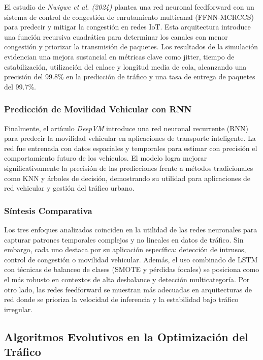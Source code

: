 \documentclass{svproc} %
\begin{document}
 El estudio de \textit{Nwigwe et al. (2024)} plantea una red neuronal feedforward con un sistema de control de congestión de enrutamiento multicanal (FFNN-MCRCCS) para predecir y mitigar la congestión en redes IoT. Esta arquitectura introduce una función recursiva cuadrática para determinar los canales con menor congestión y priorizar la transmisión de paquetes. Los resultados de la simulación evidencian una mejora sustancial en métricas clave como jitter, tiempo de estabilización, utilización del enlace y longitud media de cola, alcanzando una precisión del 99.8\% en la predicción de tráfico y una tasa de entrega de paquetes del 99.7\%.
 
\subsubsection{Predicción de Movilidad Vehicular con RNN}
 
 Finalmente, el artículo \textit{DeepVM} introduce una red neuronal recurrente (RNN) para predecir la movilidad vehicular en aplicaciones de transporte inteligente. La red fue entrenada con datos espaciales y temporales para estimar con precisión el comportamiento futuro de los vehículos. El modelo logra mejorar significativamente la precisión de las predicciones frente a métodos tradicionales como KNN y árboles de decisión, demostrando su utilidad para aplicaciones de red vehicular y gestión del tráfico urbano.
 
\subsubsection{Síntesis Comparativa}
 
 Los tres enfoques analizados coinciden en la utilidad de las redes neuronales para capturar patrones temporales complejos y no lineales en datos de tráfico. Sin embargo, cada uno destaca por su aplicación específica: detección de intrusos, control de congestión o movilidad vehicular. Además, el uso combinado de LSTM con técnicas de balanceo de clases (SMOTE y pérdidas focales) se posiciona como el más robusto en contextos de alta desbalance y detección multicategoría. Por otro lado, las redes feedforward se muestran más adecuadas en arquitecturas de red donde se prioriza la velocidad de inferencia y la estabilidad bajo tráfico irregular.

\subsection{Algoritmos Evolutivos en la Optimización del Tráfico}
\end{document}
